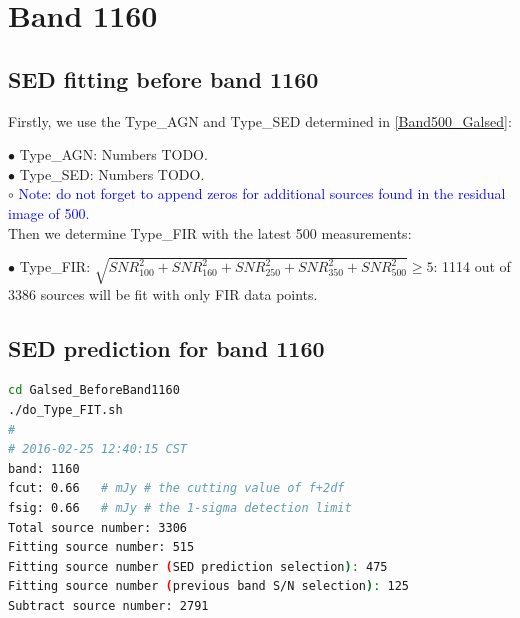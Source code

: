 \documentclass[11pt,a4paper]{article}
\begin{document}

\clearpage

\section{Band 1160}

\subsection{SED fitting before band 1160}
\label{Band1160_Galsed}

Firstly, we use the Type\_AGN and Type\_SED determined in \ref{Band500_Galsed}:

\indent\hspace{15pt}$\bullet$ 
Type\_AGN: Numbers TODO. 
\\
\indent\hspace{15pt}$\bullet$ 
Type\_SED: Numbers TODO. 
\\
\indent\hspace{15pt}$\circ$ 
\textcolor{blue}{Note: \textcolor{blue}{do not forget} to append zeros for additional sources found in the residual image of 500.}
\\

Then we determine Type\_FIR with the latest 500 measurements:

\indent\hspace{15pt}$\bullet$ 
Type\_FIR: $\sqrt{SNR_{100}^2+SNR_{160}^2+SNR_{250}^2+SNR_{350}^2+SNR_{500}^2} \ge 5$: 1114 out of 3386 sources will be fit with only FIR data points. 
\\

\subsection{SED prediction for band 1160}
\label{Band1160_Galpre}

\begin{lstlisting}[language=bash]
cd Galsed_BeforeBand1160
./do_Type_FIT.sh
# 
# 2016-02-25 12:40:15 CST
band: 1160
fcut: 0.66   # mJy # the cutting value of f+2df
fsig: 0.66   # mJy # the 1-sigma detection limit
Total source number: 3306
Fitting source number: 515
Fitting source number (SED prediction selection): 475
Fitting source number (previous band S/N selection): 125
Subtract source number: 2791

\end{lstlisting}
\end{document}
